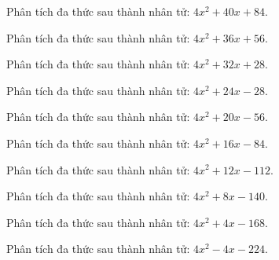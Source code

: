 \begin{bt}
	Phân tích đa thức sau thành nhân tử: $4 x^2 + 40 x + 84$.
\end{bt}
\begin{bt}
	Phân tích đa thức sau thành nhân tử: $4 x^2 + 36 x + 56$.
\end{bt}
\begin{bt}
	Phân tích đa thức sau thành nhân tử: $4 x^2 + 32 x + 28$.
\end{bt}
\begin{bt}
	Phân tích đa thức sau thành nhân tử: $4 x^2 + 24 x - 28$.
\end{bt}
\begin{bt}
	Phân tích đa thức sau thành nhân tử: $4 x^2 + 20 x - 56$.
\end{bt}
\begin{bt}
	Phân tích đa thức sau thành nhân tử: $4 x^2 + 16 x - 84$.
\end{bt}
\begin{bt}
	Phân tích đa thức sau thành nhân tử: $4 x^2 + 12 x - 112$.
\end{bt}
\begin{bt}
	Phân tích đa thức sau thành nhân tử: $4 x^2 + 8 x - 140$.
\end{bt}
\begin{bt}
	Phân tích đa thức sau thành nhân tử: $4 x^2 + 4 x - 168$.
\end{bt}
\begin{bt}
	Phân tích đa thức sau thành nhân tử: $4 x^2 - 4 x - 224$.
\end{bt}
